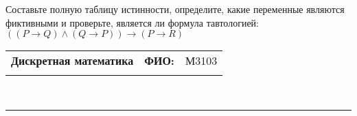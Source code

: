 \documentclass[10pt]{exam}
\newcommand{\class}{Дискретная математика}
\newcommand{\examdate}{}
\begin{document}
\begin{questions}
\begin{enumerate} [a)]
\end{enumerate}\question Составьте полную таблицу истинности, определите, какие переменные являются фиктивными и проверьте, является ли формула тавтологией:
$(( P \rightarrow Q) \land (Q \rightarrow P)) \rightarrow (P \rightarrow R)$

\end{questions}
\newpage
\begin{flushright}
\begin{tabular}{p{2.8in} r l}
\textbf{\class} & \textbf{ФИО:} &М3103
\\

\textbf{\examdate} &&\\
\end{tabular}\\
\end{flushright}
\rule[1ex]{\textwidth}{.1pt}
\end{document}
